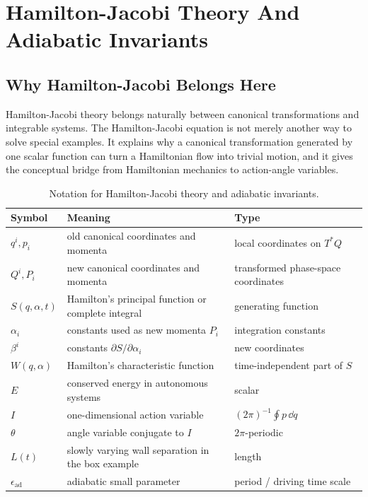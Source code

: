 \chapter{Hamilton-Jacobi Theory And Adiabatic Invariants}
\label{chap:hamilton-jacobi}

\section{Why Hamilton-Jacobi Belongs Here}
\label{sec:why-hamilton-jacobi}

Hamilton-Jacobi theory belongs naturally between canonical transformations and
integrable systems. The Hamilton-Jacobi equation is not merely another way to
solve special examples. It explains why a canonical transformation generated by
one scalar function can turn a Hamiltonian flow into trivial motion, and it
gives the conceptual bridge from Hamiltonian mechanics to action-angle
variables.

\begin{table}[htbp]
\centering
\caption{Notation for Hamilton-Jacobi theory and adiabatic invariants.}
\label{tab:hj-notation}
\small
\begin{tabular}{p{}p{}p{}}
\toprule
Symbol & Meaning & Type\\
\midrule
\(q^i,p_i\) & old canonical coordinates and momenta & local coordinates on \(T^*Q\)\\
\(Q^i,P_i\) & new canonical coordinates and momenta & transformed phase-space coordinates\\
\(S(q,\alpha,t)\) & Hamilton's principal function or complete integral & generating function\\
\(\alpha_i\) & constants used as new momenta \(P_i\) & integration constants\\
\(\beta^i\) & constants \(\partial S/\partial\alpha_i\) & new coordinates\\
\(W(q,\alpha)\) & Hamilton's characteristic function & time-independent part of \(S\)\\
\(E\) & conserved energy in autonomous systems & scalar\\
\(I\) & one-dimensional action variable & \((2\pi)^{-1}\oint p\,\dd q\)\\
\(\theta\) & angle variable conjugate to \(I\) & \(2\pi\)-periodic\\
\(L(t)\) & slowly varying wall separation in the box example & length\\
\(\epsilon_{\mathrm{ad}}\) & adiabatic small parameter & period / driving time scale\\
\bottomrule
\end{tabular}
\end{table}

